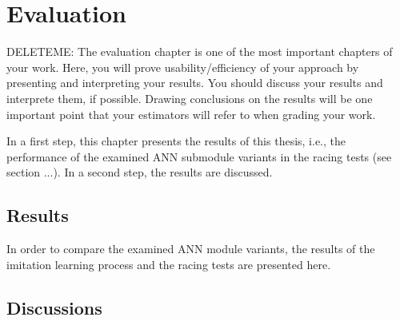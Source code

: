 \chapter{Evaluation}
\label{evaluation}
DELETEME: The evaluation chapter is one of the most important chapters of your work. Here, you will prove usability/efficiency of your approach by presenting and interpreting your results. You should discuss your results and interprete them, if possible. Drawing conclusions on the results will be one important point that your estimators will refer to when grading your work.

In a first step, this chapter presents the results of this thesis,
i.e., the performance of the examined ANN submodule variants
in the racing tests (see section ...).
In a second step, the results are discussed.

\section{Results}
\label{results}
In order to compare the examined ANN module variants,
the results of the imitation learning process
and the racing tests are presented here.







\section{Discussions}
\label{discussions}